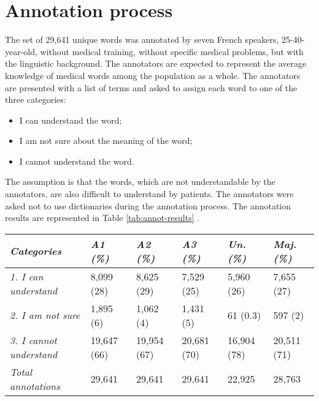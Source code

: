 \section{Annotation process}
\label{sec:annotation-process}
The set of 29,641 unique words was annotated by seven French speakers, 25-40-year-old, without medical training, without specific medical problems, but with the linguistic background. The annotators are expected to represent the average knowledge of medical words among the population as a whole. The annotators are presented with a list of terms and asked to assign each word to one of the three categories:

\begin{itemize}
    \item  I can understand the word;
    \item  I am not sure about the meaning of the word;
    \item  I cannot understand the word.
\end{itemize}
The assumption is that the words, which are not understandable by the annotators, are also difficult to understand by patients. The annotators were asked not to use dictionaries during the annotation process. The annotation results are represented in Table \ref{tab:annot-results} .

\begin{table*}[h]
\begin{tabular}{l|lllll}
\hline
\textit{Categories}             & \textit{A1 (\%)} & \textit{A2 (\%)} & \textit{A3 (\%)} & \textit{Un. (\%)} & \textit{Maj. (\%)} \\ \hline
\textit{1. I can understand}    & 8,099 (28)     & 8,625 (29)     & 7,529 (25)     & 5,960 (26)            & 7,655 (27)           \\
\textit{2. I am not sure}       & 1,895 (6)      & 1,062 (4)      & 1,431 (5)      & 61 (0.3)              & 597 (2)              \\
\textit{3. I cannot understand} & 19,647 (66)    & 19,954 (67)    & 20,681 (70)    & 16,904 (78)         & 20,511 (71)          \\ \hline
\textit{Total annotations}      & 29,641           & 29,641           & 29,641           & 22,925                  & 28,763                 \\ \hline
\end{tabular}
    \caption{Number (and percentage) of words assigned to reference categories by three annotators (A1, A2
    and A3), and in the derived unanimity (Un.) and majority (Maj.) datasets.}
    \label{tab:annot-results}
\end{table*}

